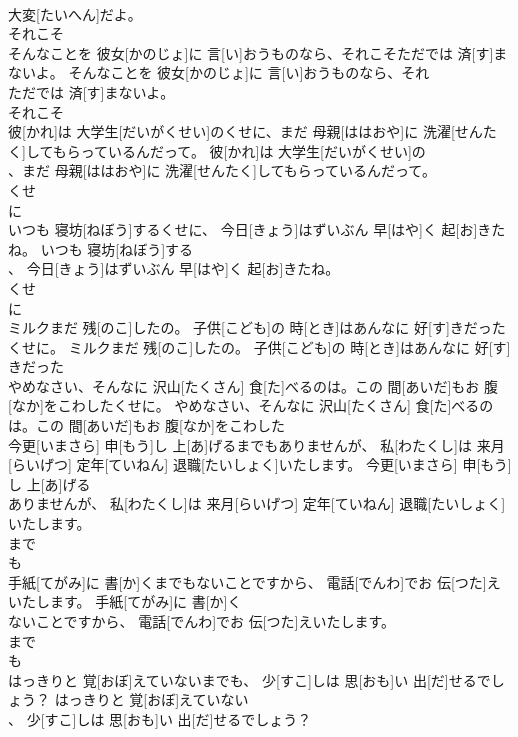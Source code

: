 \documentclass[8pt]{extreport}
\begin{document}
\begin{CJK}{UTF8}{min}
\\	大変[たいへん]だよ。	
\\	それこそ
\\	そんなことを 彼女[かのじょ]に 言[い]おうものなら、それこそただでは 済[す]まないよ。	そんなことを 彼女[かのじょ]に 言[い]おうものなら、それ
\\	ただでは 済[す]まないよ。	
\\	それこそ
\\	彼[かれ]は 大学生[だいがくせい]のくせに、まだ 母親[ははおや]に 洗濯[せんたく]してもらっているんだって。	彼[かれ]は 大学生[だいがくせい]の
\\	、まだ 母親[ははおや]に 洗濯[せんたく]してもらっているんだって。	
\\	くせ 
\\	に 
\\	いつも 寝坊[ねぼう]するくせに、 今日[きょう]はずいぶん 早[はや]く 起[お]きたね。	いつも 寝坊[ねぼう]する
\\	、 今日[きょう]はずいぶん 早[はや]く 起[お]きたね。	
\\	くせ 
\\	に 
\\	ミルクまだ 残[のこ]したの。 子供[こども]の 時[とき]はあんなに 好[す]きだったくせに。	ミルクまだ 残[のこ]したの。 子供[こども]の 時[とき]はあんなに 好[す]きだった
\\	やめなさい、そんなに 沢山[たくさん] 食[た]べるのは。この 間[あいだ]もお 腹[なか]をこわしたくせに。	やめなさい、そんなに 沢山[たくさん] 食[た]べるのは。この 間[あいだ]もお 腹[なか]をこわした
\\	今更[いまさら] 申[もう]し 上[あ]げるまでもありませんが、 私[わたくし]は 来月[らいげつ] 定年[ていねん] 退職[たいしょく]いたします。	今更[いまさら] 申[もう]し 上[あ]げる
\\	ありませんが、 私[わたくし]は 来月[らいげつ] 定年[ていねん] 退職[たいしょく]いたします。	
\\	まで 
\\	も 
\\	手紙[てがみ]に 書[か]くまでもないことですから、 電話[でんわ]でお 伝[つた]えいたします。	手紙[てがみ]に 書[か]く
\\	ないことですから、 電話[でんわ]でお 伝[つた]えいたします。	
\\	まで 
\\	も 
\\	はっきりと 覚[おぼ]えていないまでも、 少[すこ]しは 思[おも]い 出[だ]せるでしょう？	はっきりと 覚[おぼ]えていない
\\	、 少[すこ]しは 思[おも]い 出[だ]せるでしょう？	

\end{CJK}
\end{document}
